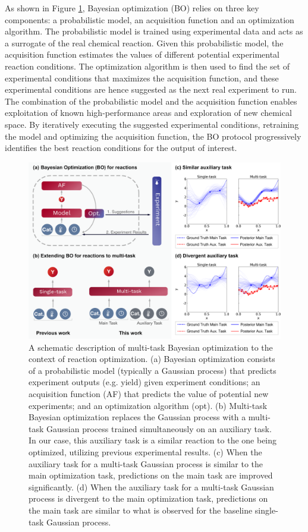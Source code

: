 As shown in Figure \ref{fig:multitask_overview}, Bayesian optimization (BO) relies on three key components: a probabilistic model, an acquisition function and an optimization algorithm. The probabilistic model is trained using experimental data and acts as a surrogate of the real chemical reaction. Given this probabilistic model, the acquisition function estimates the values of different potential experimental reaction conditions. The optimization algorithm is then used to find the set of experimental conditions that maximizes the acquisition function, and these experimental conditions are hence suggested as the next real experiment to run. The combination of the probabilistic model and the acquisition function enables exploitation of known high-performance areas and exploration of new chemical space. By iteratively executing the suggested experimental conditions, retraining the model and optimizing the acquisition function, the BO protocol progressively identifies the best reaction conditions for the output of interest.

\begin{figure}
    \centering
    \includegraphics[width=1.2\textwidth]{gfx/Chapter03/paper_figure_1.png}
    \caption{A schematic description of multi-task Bayesian optimization to the context of reaction optimization. (a) Bayesian optimization consists of a probabilistic model (typically a Gaussian process) that predicts experiment outputs (e.g. yield) given experiment conditions; an acquisition function (AF) that predicts the value of potential new experiments; and an optimization algorithm (opt). (b) Multi-task Bayesian optimization replaces the Gaussian process with a multi-task Gaussian process trained simultaneously on an auxiliary task. In our case, this auxiliary task is a similar reaction to the one being optimized, utilizing previous experimental results. (c) When the auxiliary task for a multi-task Gaussian process is similar to the main optimization task, predictions on the main task are improved significantly. (d) When the auxiliary task for a multi-task Gaussian process is divergent to the main optimization task, predictions on the main task are similar to what is observed for the baseline single-task Gaussian process.}
    \label{fig:multitask_overview}
\end{figure}

